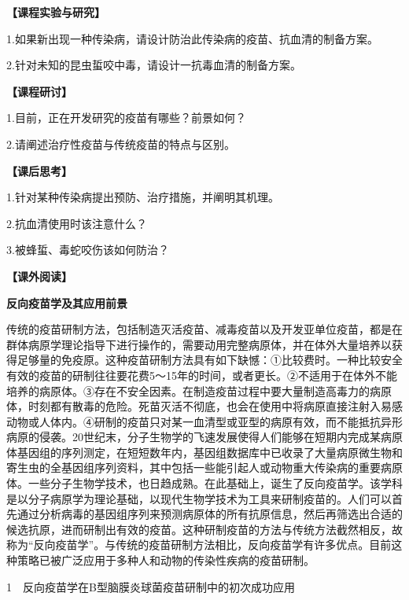 \noindent\textbf{【课程实验与研究】}

1.如果新出现一种传染病，请设计防治此传染病的疫苗、抗血清的制备方案。

2.针对未知的昆虫蜇咬中毒，请设计一抗毒血清的制备方案。

\noindent\textbf{【课程研讨】}

1.目前，正在开发研究的疫苗有哪些？前景如何？

2.请阐述治疗性疫苗与传统疫苗的特点与区别。

\noindent\textbf{【课后思考】}

1.针对某种传染病提出预防、治疗措施，并阐明其机理。

2.抗血清使用时该注意什么？

3.被蜂蜇、毒蛇咬伤该如何防治？

\noindent\textbf{【课外阅读】}

\begin{center}
 \textbf{\Large 反向疫苗学及其应用前景}
 \end{center}

传统的疫苗研制方法，包括制造灭活疫苗、减毒疫苗以及开发亚单位疫苗，都是在群体病原学理论指导下进行操作的，需要动用完整病原体，并在体外大量培养以获得足够量的免疫原。这种疫苗研制方法具有如下缺憾：①比较费时。一种比较安全有效的疫苗的研制往往要花费5～15年的时间，或者更长。②不适用于在体外不能培养的病原体。③存在不安全因素。在制造疫苗过程中要大量制造高毒力的病原体，时刻都有散毒的危险。死苗灭活不彻底，也会在使用中将病原直接注射入易感动物或人体内。④研制的疫苗只对某一血清型或亚型的病原有效，而不能抵抗异形病原的侵袭。20世纪末，分子生物学的飞速发展使得人们能够在短期内完成某病原体基因组的序列测定，在短短数年内，基因组数据库中已收录了大量病原微生物和寄生虫的全基因组序列资料，其中包括一些能引起人或动物重大传染病的重要病原体。一些分子生物学技术，也日趋成熟。在此基础上，诞生了反向疫苗学。该学科是以分子病原学为理论基础，以现代生物学技术为工具来研制疫苗的。人们可以首先通过分析病毒的基因组序列来预测病原体的所有抗原信息，然后再筛选出合适的候选抗原，进而研制出有效的疫苗。这种研制疫苗的方法与传统方法截然相反，故称为“反向疫苗学”。与传统的疫苗研制方法相比，反向疫苗学有许多优点。目前这种策略已被广泛应用于多种人和动物的传染性疾病的疫苗研制。

1　反向疫苗学在B型脑膜炎球菌疫苗研制中的初次成功应用

